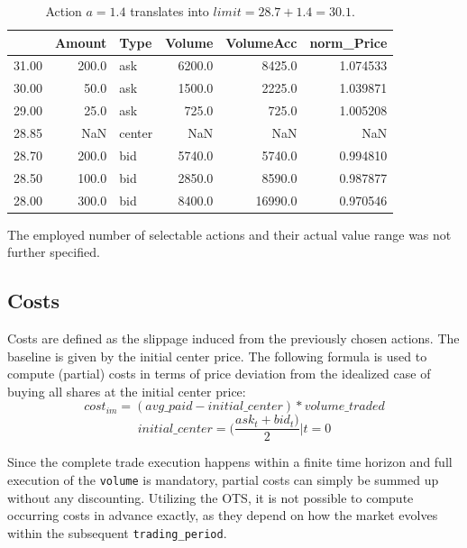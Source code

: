 \begin{table}
\centering
\begin{tabular}{lrlrrr}
\toprule
{} &  Amount &    Type &  Volume &  VolumeAcc &  norm\_Price \\
\midrule
31.00 &   200.0 &     ask &  6200.0 &     8425.0 &    1.074533 \\
30.00 &    50.0 &     ask &  1500.0 &     2225.0 &    1.039871 \\
29.00 &    25.0 &     ask &   725.0 &      725.0 &    1.005208 \\
28.85 &     NaN &  center &     NaN &        NaN &         NaN \\
28.70 &   200.0 &     bid &  5740.0 &     5740.0 &    0.994810 \\
28.50 &   100.0 &     bid &  2850.0 &     8590.0 &    0.987877 \\
28.00 &   300.0 &     bid &  8400.0 &    16990.0 &    0.970546 \\
\bottomrule
\end{tabular}
\caption{Action $a=1.4$ translates into $limit=28.7 + 1.4 = 30.1$.}
\label{table:orderbook:example:again}
\end{table}

The employed number of selectable actions and their actual value range was not further specified.


\subsection{Costs}
\label{chap:costs}
Costs are defined as the slippage induced from the previously chosen actions. The baseline is given by the initial center price. The following formula is used to compute (partial) costs in terms of price deviation from the idealized case of buying all shares at the initial center price:
\begin{equation}
\label{eq:imcost}
   cost_{im} = (avg\_paid - initial\_center) * volume\_traded
\end{equation}
\begin{equation}
   initial\_center = (\dfrac{ask_t+bid_t)}{2} | t=0
\end{equation}

Since the complete trade execution happens within a finite time horizon and full execution of the \lstinline!volume! is mandatory, partial costs can simply be summed up without any discounting. Utilizing the \ac{OTS}, it is not possible to compute occurring costs in advance exactly, as they depend on how the market evolves within the subsequent \lstinline!trading_period!.


